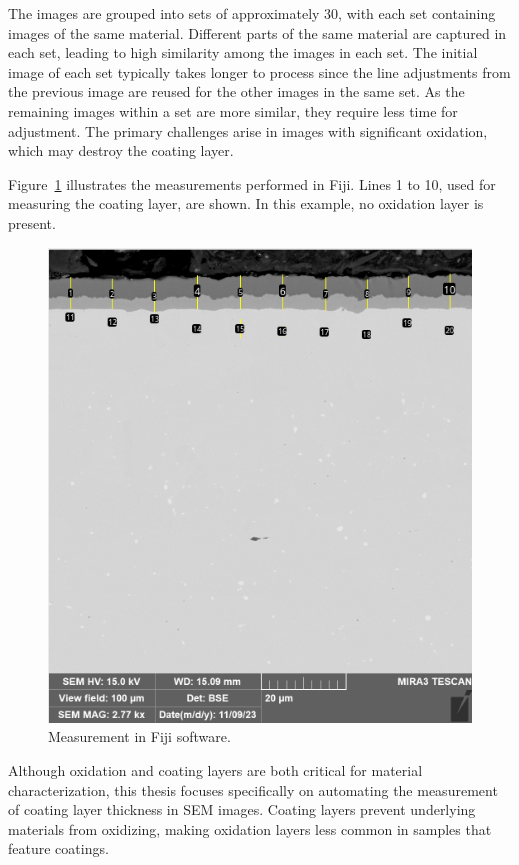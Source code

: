 The images are grouped into sets of approximately 30, with each set containing images of the same material. Different parts of the same material are captured in each set, leading to high similarity among the images in each set. The initial image of each set typically takes longer to process since the line adjustments from the previous image are reused for the other images in the same set. As the remaining images within a set are more similar, they require less time for adjustment. The primary challenges arise in images with significant oxidation, which may destroy the coating layer.

Figure~\ref{fig:Fiji} illustrates the measurements performed in Fiji. Lines 1 to 10, used for measuring the coating layer, are shown. In this example, no oxidation layer is present.

\begin{figure}[H]
    \centering
    \includegraphics[width=0.7\linewidth]{PICTURES/625_Al2O3_3500h_low_cross_strana2_13_measurements.png}
    \caption{Measurement in Fiji software.}
    \label{fig:Fiji}
\end{figure}


Although oxidation and coating layers are both critical for material characterization, this thesis focuses specifically on automating the measurement of coating layer thickness in SEM images. Coating layers prevent underlying materials from oxidizing, making oxidation layers less common in samples that feature coatings.

